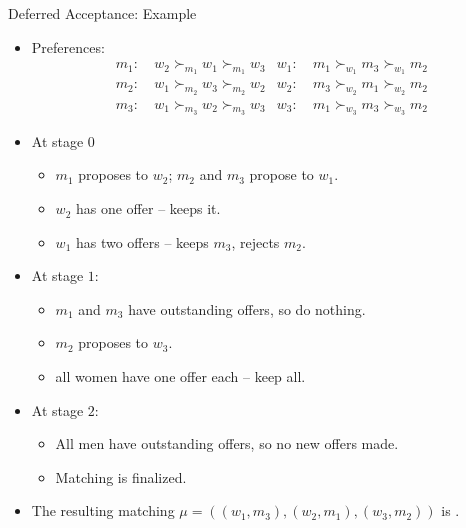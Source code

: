 \documentclass[english,10pt
,aspectratio=169
]{beamer}
\begin{document}
\begin{frame}{Deferred Acceptance: Example}
\begin{example}
	\begin{itemize}
		\item Preferences:
		{\footnotesize
			\begin{align*}
				m_1:& \ w_2 \succ_{m_1} w_1 \succ_{m_1} w_3 	& w_1:& \ m_1 \succ_{w_1} m_3 \succ_{w_1} m_2
				\\
				m_2:& \ w_1 \succ_{m_2} w_3 \succ_{m_2} w_2 	& w_2:& \ m_3 \succ_{w_2} m_1 \succ_{w_2} m_2
				\\
				m_3:& \ w_1 \succ_{m_3} w_2 \succ_{m_3} w_3 	& w_3:& \ m_1 \succ_{w_3} m_3 \succ_{w_3} m_2
			\end{align*}
		}
		\item At stage $0$ 
		\begin{itemize}
			\item $m_1$ proposes to $w_2$; $m_2$ and $m_3$ propose to $w_1$.
			\item $w_2$ has one offer -- keeps it.
			\item $w_1$ has two offers -- keeps $m_3$, rejects $m_2$.
		\end{itemize}
		\item At stage $1$: 
		\begin{itemize}
			\item $m_1$ and $m_3$ have outstanding offers, so do nothing.
			\item $m_2$ proposes to $w_3$.
			\item all women have one offer each -- keep all.
		\end{itemize}
		\item At stage $2$:
		\begin{itemize}
			\item All men have outstanding offers, so no new offers made.
			\item Matching is finalized.
		\end{itemize}
		\item The resulting matching $\mu = \left( (w_1,m_3), (w_2,m_1), (w_3,m_2) \right)$ is .
	\end{itemize}
\end{example}
\end{frame}
\end{document}
